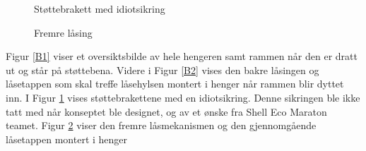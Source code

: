 \begin{figure}[H]
\centering   
{}
\caption{Støttebrakett med idiotsikring}
\label{B3}
\end{figure}
\begin{figure}[H]
\centering   
{}
\caption{Fremre låsing}
\label{B4}
\end{figure}
Figur \ref{B1} viser et oversiktsbilde av hele hengeren samt rammen når den er dratt ut og står på støttebena.
Videre i Figur \ref{B2} vises den bakre låsingen og låsetappen som skal treffe låsehylsen montert i henger når rammen blir dyttet inn. I Figur \ref{B3} vises støttebrakettene med en idiotsikring. Denne sikringen ble ikke tatt med når konseptet ble designet, og av et ønske fra Shell Eco Maraton teamet. 
Figur \ref{B4} viser den fremre låsmekanismen og den gjennomgående låsetappen montert i henger
